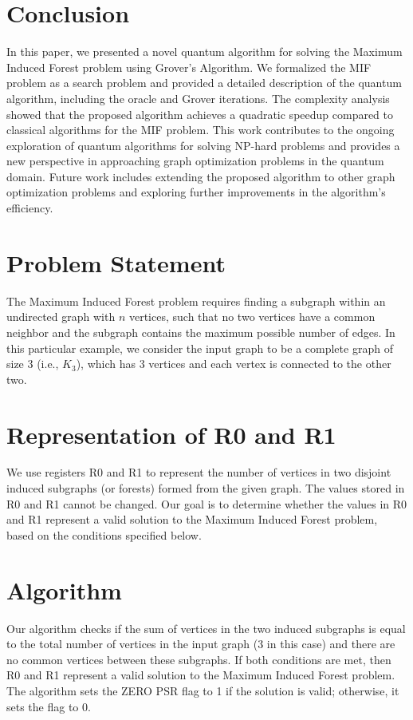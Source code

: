 \section{Conclusion}

In this paper, we presented a novel quantum algorithm for solving the Maximum Induced Forest problem using Grover's Algorithm. We formalized the MIF problem as a search problem and provided a detailed description of the quantum algorithm, including the oracle and Grover iterations. The complexity analysis showed that the proposed algorithm achieves a quadratic speedup compared to classical algorithms for the MIF problem. This work contributes to the ongoing exploration of quantum algorithms for solving NP-hard problems and provides a new perspective in approaching graph optimization problems in the quantum domain. Future work includes extending the proposed algorithm to other graph optimization problems and exploring further improvements in the algorithm's efficiency.

\section{Problem Statement}

The Maximum Induced Forest problem requires finding a subgraph within an undirected graph with $n$ vertices, such that no two vertices have a common neighbor and the subgraph contains the maximum possible number of edges. In this particular example, we consider the input graph to be a complete graph of size 3 (i.e., $K_3$), which has 3 vertices and each vertex is connected to the other two. 

\section{Representation of R0 and R1}

We use registers R0 and R1 to represent the number of vertices in two disjoint induced subgraphs (or forests) formed from the given graph. The values stored in R0 and R1 cannot be changed. Our goal is to determine whether the values in R0 and R1 represent a valid solution to the Maximum Induced Forest problem, based on the conditions specified below.

\section{Algorithm}

Our algorithm checks if the sum of vertices in the two induced subgraphs is equal to the total number of vertices in the input graph (3 in this case) and there are no common vertices between these subgraphs. If both conditions are met, then R0 and R1 represent a valid solution to the Maximum Induced Forest problem. The algorithm sets the ZERO PSR flag to 1 if the solution is valid; otherwise, it sets the flag to 0. 

